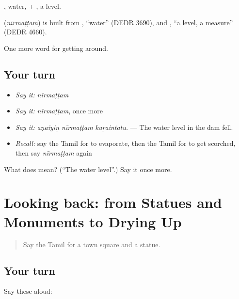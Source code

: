 , water, + , a level.

\begin{cousinweb}
\textbf{} (\emph{nīrmaṭṭam}) is built from , \textquotedblleft{}water\textquotedblright{} (DEDR 3690), and , \textquotedblleft{}a level, a measure\textquotedblright{} (DEDR 4660).
\end{cousinweb}

\begin{grammarlens}[title={What you've built}]
One more word for getting around.
\end{grammarlens}

\subsection*{Your turn}
\begin{itemize}
\raggedright
  \item \emph{Say it:} \emph{nīrmaṭṭam}
  \item \emph{Say it:} \emph{nīrmaṭṭam}, once more
  \item \emph{Say it:} \emph{aṇaiyiṉ nīrmaṭṭam kuṟaintatu.} — The water level in the dam fell.
  \item \emph{Recall:} say the Tamil for to evaporate, then the Tamil for to get scorched, then say \emph{nīrmaṭṭam} again
\end{itemize}

\begin{tcolorbox}[breakable,colback=teal!4,colframe=teal!35!black,title={Before you move on}]
What does  mean? (\textquotedblleft{}The water level\textquotedblright{}.) Say it once more.
\end{tcolorbox}
\section[(dialogue)]{Looking back: from Statues and Monuments to Drying Up}

\label{lesson:TA-R431-review-424-431}



\begin{quote}
Say the Tamil for a town square and a statue.
\end{quote}

\subsection*{Your turn}
Say these aloud:

